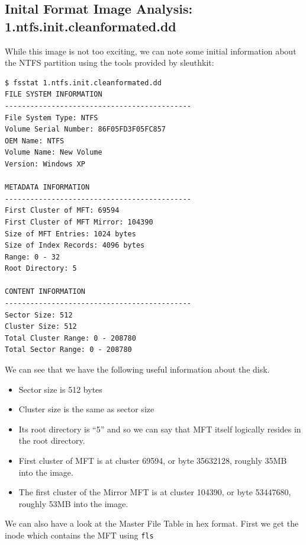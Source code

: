 \documentclass[a4paper,
    11pt,
    normalheadings,
    parindent,
    UKenglish,
    abstracton,
    ]{scrartcl}
\begin{document}
\subsection{Inital Format Image Analysis: 1.ntfs.init.cleanformated.dd }
While this image is not too exciting, we can note some initial information about the NTFS partition using the tools provided by sleuthkit:
\begin{verbatim}
$ fsstat 1.ntfs.init.cleanformated.dd
FILE SYSTEM INFORMATION
--------------------------------------------
File System Type: NTFS
Volume Serial Number: 86F05FD3F05FC857
OEM Name: NTFS
Volume Name: New Volume
Version: Windows XP

METADATA INFORMATION
--------------------------------------------
First Cluster of MFT: 69594
First Cluster of MFT Mirror: 104390
Size of MFT Entries: 1024 bytes
Size of Index Records: 4096 bytes
Range: 0 - 32
Root Directory: 5

CONTENT INFORMATION
--------------------------------------------
Sector Size: 512
Cluster Size: 512
Total Cluster Range: 0 - 208780
Total Sector Range: 0 - 208780
\end{verbatim}
We can see that we have the following useful information about the disk.
\begin{itemize}
        \item Sector size is 512 bytes
        \item Cluster size is the same as sector size
        \item Its root directory is ``5'' and so we can say that MFT itself logically resides in the root directory.
        \item First cluster of MFT is at cluster 69594, or byte 35632128, roughly 35MB into the image.
        \item The first cluster of the Mirror MFT is at cluster 104390, or byte 53447680, roughly 53MB into the image.
\end{itemize}

We can also have a look at the Master File Table in hex format.
First we get the inode which contains the MFT using \texttt{fls}
\end{document}
